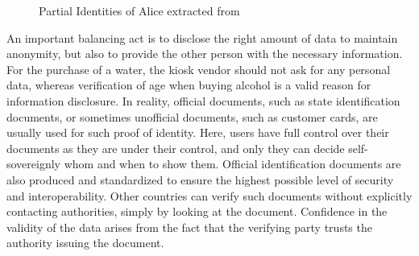     \begin{figure}[ht]
        \centering
        \caption{Partial Identities of Alice extracted from \cite{claus_identity_2001}}
        \label{figure: alice}
    \end{figure}

    An important balancing act is to disclose the right amount of data to maintain anonymity, but also to provide the other person with the necessary information. For the purchase of a water, the kiosk vendor should not ask for any personal data, whereas verification of age when buying alcohol is a valid reason for information disclosure. In reality, official documents, such as state identification documents, or sometimes unofficial documents, such as customer cards, are usually used for such proof of identity. Here, users have full control over their documents as they are under their control, and only they can decide self-sovereignly whom and when to show them. Official identification documents are also produced and standardized to ensure the highest possible level of security and interoperability. Other countries can verify such documents without explicitly contacting authorities, simply by looking at the document. Confidence in the validity of the data arises from the fact that the verifying party trusts the authority issuing the document. \cite[p. 6]{struker_grundlagen_2021}

